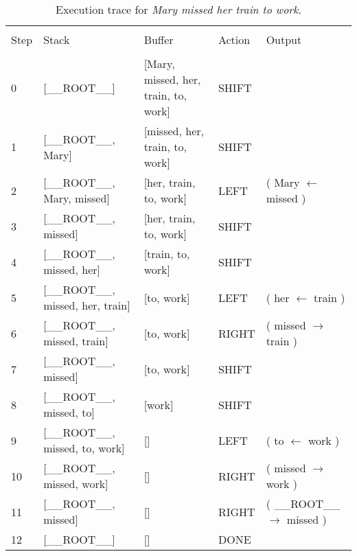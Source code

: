 \documentclass[
12pt,
a4paper,
oneside,
headinclude,
footinclude]{article}
\begin{document}
    \begin{center}
    \begin{table}[H]   
        \hspace*{-2.0cm}
        \begin{tabular}{l p{5cm} p{5cm} l l} %
            \hline
            \hline 
            \\[-1.5ex]
            \textcolor{BrickRed}{Step} & \textcolor{BrickRed}{Stack} & \textcolor{BrickRed}{Buffer} & \textcolor{BrickRed}{Action} & \textcolor{BrickRed}{Output}\\ [0.5ex]
            \hline %
            \\[-1.5ex]
            0 & [\_\_ROOT\_\_] & [Mary, missed, her, train, to, work] & SHIFT & \\ 
            1 & [\_\_ROOT\_\_, Mary] & [missed, her, train, to, work] & SHIFT & \\ 
            2 & [\_\_ROOT\_\_, Mary, missed] & [her, train, to, work] & LEFT & ( Mary $\leftarrow$ missed )\\ 
            3 & [\_\_ROOT\_\_, missed] & [her, train, to, work] & SHIFT & \\ 
            4 & [\_\_ROOT\_\_, missed, her] & [train, to, work] & SHIFT & \\ 
            5 & [\_\_ROOT\_\_, missed, her, train] & [to, work] & LEFT & ( her $\leftarrow$ train )\\ 
            6 & [\_\_ROOT\_\_, missed, train] & [to, work] & RIGHT & ( missed $\rightarrow$ train )\\ 
            7 & [\_\_ROOT\_\_, missed] & [to, work] & SHIFT & \\ 
            8 & [\_\_ROOT\_\_, missed, to] & [work] & SHIFT & \\ 
            9 & [\_\_ROOT\_\_, missed, to, work] & [] & LEFT & ( to $\leftarrow$ work )\\ 
            10 & [\_\_ROOT\_\_, missed, work] & [] & RIGHT & ( missed $\rightarrow$ work )\\ 
            11 & [\_\_ROOT\_\_, missed] & [] & RIGHT & ( \_\_ROOT\_\_ $\rightarrow$ missed )\\ 
            12 & [\_\_ROOT\_\_] & [] & DONE &             
            \\[1ex] %
            \hline %
        \end{tabular}
        \caption{\label{tab:trace-2}Execution trace for \textit{Mary missed her train to work}.}
    \end{table} 
    \end{center}
\end{document}

